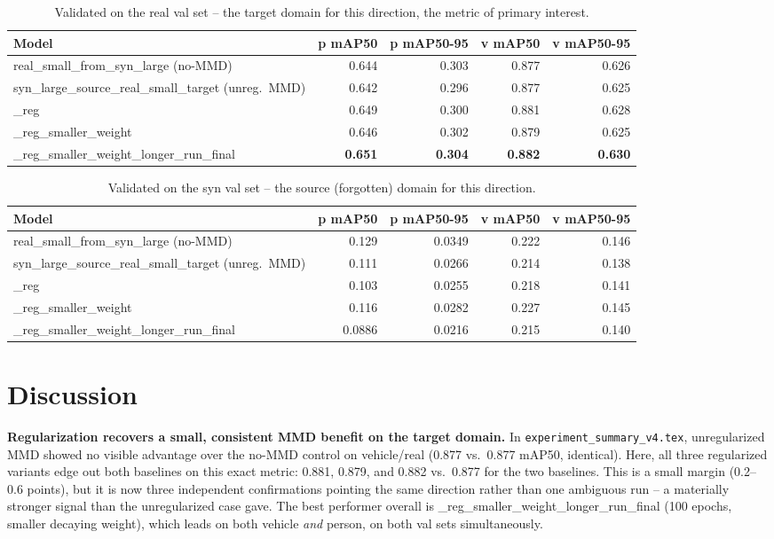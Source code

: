 \documentclass[11pt]{article}
\begin{document}
\begin{table}[h!]
    \centering
    \begin{tabular}{lrrrr}
        \toprule
        Model & p mAP50 & p mAP50-95 & v mAP50 & v mAP50-95 \\
        \midrule
        real\_small\_from\_syn\_large (no-MMD) & 0.644 & 0.303 & 0.877 & 0.626 \\
        syn\_large\_source\_real\_small\_target (unreg.\ MMD) & 0.642 & 0.296 & 0.877 & 0.625 \\
        \_reg & 0.649 & 0.300 & 0.881 & 0.628 \\
        \_reg\_smaller\_weight & 0.646 & 0.302 & 0.879 & 0.625 \\
        \_reg\_smaller\_weight\_longer\_run\_final & \textbf{0.651} & \textbf{0.304} & \textbf{0.882} & \textbf{0.630} \\
        \bottomrule
    \end{tabular}
    \caption{Validated on the real val set -- the target domain for this direction,
    the metric of primary interest.}
\end{table}

\begin{table}[h!]
    \centering
    \begin{tabular}{lrrrr}
        \toprule
        Model & p mAP50 & p mAP50-95 & v mAP50 & v mAP50-95 \\
        \midrule
        real\_small\_from\_syn\_large (no-MMD) & 0.129 & 0.0349 & 0.222 & 0.146 \\
        syn\_large\_source\_real\_small\_target (unreg.\ MMD) & 0.111 & 0.0266 & 0.214 & 0.138 \\
        \_reg & 0.103 & 0.0255 & 0.218 & 0.141 \\
        \_reg\_smaller\_weight & 0.116 & 0.0282 & 0.227 & 0.145 \\
        \_reg\_smaller\_weight\_longer\_run\_final & 0.0886 & 0.0216 & 0.215 & 0.140 \\
        \bottomrule
    \end{tabular}
    \caption{Validated on the syn val set -- the source (forgotten) domain for this
    direction.}
\end{table}

\section{Discussion}

\textbf{Regularization recovers a small, consistent MMD benefit on the target
domain.} In \texttt{experiment\_summary\_v4.tex}, unregularized MMD showed no visible
advantage over the no-MMD control on vehicle/real (0.877 vs.\ 0.877 mAP50, identical).
Here, all three regularized variants edge out both baselines on this exact metric:
0.881, 0.879, and 0.882 vs.\ 0.877 for the two baselines. This is a small margin
(0.2--0.6 points), but it is now three independent confirmations pointing the same
direction rather than one ambiguous run -- a materially stronger signal than the
unregularized case gave. The best performer overall is
\_reg\_smaller\_weight\_longer\_run\_final (100 epochs, smaller decaying weight),
which leads on both vehicle \emph{and} person, on both val sets simultaneously.
\end{document}
